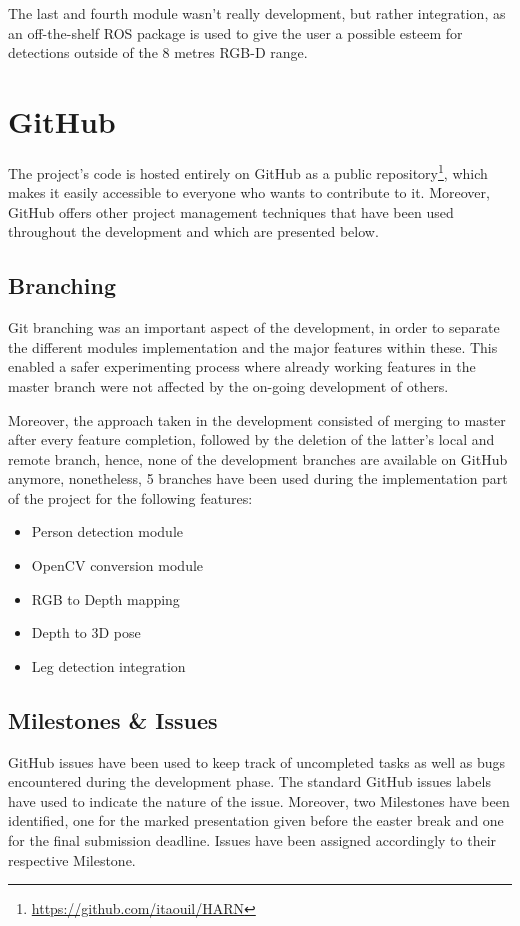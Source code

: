 The last and fourth module wasn't really development, but rather integration, as an off-the-shelf ROS package is used to give the user a possible esteem for detections outside of the 8 metres RGB-D range.

\section{GitHub}

The project's code is hosted entirely on GitHub as a public repository\footnote{ \url{https://github.com/itaouil/HARN}}, which makes it easily accessible to everyone who wants to contribute to it. Moreover, GitHub offers other project management techniques that have been used throughout the development and which are presented below.

\subsection{Branching}

Git branching was an important aspect of the development, in order to separate the different modules implementation and the major features within these. This enabled a safer experimenting process where already working features in the master branch were not affected by the on-going development of others. 

Moreover, the approach taken in the development consisted of merging to master after every feature completion, followed by the deletion of the latter's local and remote branch, hence, none of the development branches are available on GitHub anymore, nonetheless, 5 branches have been used during the implementation part of the project for the following features:

\begin{itemize}
  \item Person detection module
  \item OpenCV conversion module
  \item RGB to Depth mapping
  \item Depth to 3D pose
  \item Leg detection integration
\end{itemize}

\subsection{Milestones \& Issues}

GitHub issues have been used to keep track of uncompleted tasks as well as bugs encountered during the development phase. The standard GitHub issues labels have used to indicate the nature of the issue. Moreover, two Milestones have been identified, one for the marked presentation given before the easter break and one for the final submission deadline. Issues have been assigned accordingly to their respective Milestone.

